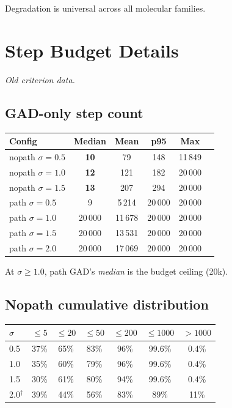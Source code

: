 \documentclass[11pt,a4paper]{article}
\begin{document}
Degradation is universal across all molecular families.

\section{Step Budget Details}
\label{app:budget}

\textit{Old criterion data.}

\subsection{GAD-only step count}

\begin{center}
\begin{tabular}{lccccc}
\toprule
Config & Median & Mean & p95 & Max \\
\midrule
nopath $\sigma=0.5$ & \textbf{10}  & 79   & 148   & 11\,849 \\
nopath $\sigma=1.0$ & \textbf{12}  & 121  & 182   & 20\,000 \\
nopath $\sigma=1.5$ & \textbf{13}  & 207  & 294   & 20\,000 \\
\midrule
path $\sigma=0.5$   & 9     & 5\,214  & 20\,000 & 20\,000 \\
path $\sigma=1.0$   & 20\,000 & 11\,678 & 20\,000 & 20\,000 \\
path $\sigma=1.5$   & 20\,000 & 13\,531 & 20\,000 & 20\,000 \\
path $\sigma=2.0$   & 20\,000 & 17\,069 & 20\,000 & 20\,000 \\
\bottomrule
\end{tabular}
\end{center}

At $\sigma \geq 1.0$, path GAD's \emph{median} is the budget ceiling (20k).

\subsection{Nopath cumulative distribution}

\begin{center}
\begin{tabular}{lcccccc}
\toprule
$\sigma$ & $\leq 5$ & $\leq 20$ & $\leq 50$ & $\leq 200$ & $\leq 1000$ & $>1000$ \\
\midrule
0.5 & 37\% & 65\% & 83\% & 96\% & 99.6\% & 0.4\% \\
1.0 & 35\% & 60\% & 79\% & 96\% & 99.6\% & 0.4\% \\
1.5 & 30\% & 61\% & 80\% & 94\% & 99.6\% & 0.4\% \\
2.0$^\dagger$ & 39\% & 44\% & 56\% & 83\% & 89\% & 11\% \\
\bottomrule
\end{tabular}
\end{center}
\end{document}
